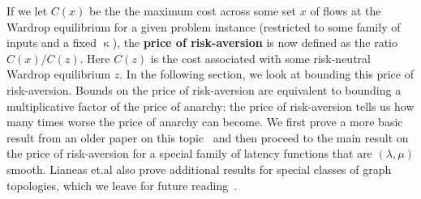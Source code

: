 If we let $C(x)$ be the the maximum cost across some set $x$ of flows at the Wardrop equilibrium for a given problem instance 
(restricted to some family of inputs and a fixed $\upkappa$), the {\textbf{price of risk-aversion}} is now defined as the
ratio $C(x)/C(z)$. Here $C(z)$ is the cost associated with some risk-neutral Wardrop equilibrium $z$. 
In the following section, we look at bounding this price of risk-aversion. 
Bounds on the price of risk-aversion are equivalent to bounding 
a multiplicative factor of the price of anarchy: the price of risk-aversion tells us how many times worse 
the price of anarchy can become.
We first prove a 
more basic result from an older paper on this topic~\cite{risk-averse-background} and then proceed to the main result on the price
of risk-aversion for 
a special family of latency functions that are $(\lambda, \mu)$ smooth. Lianeas et.al also prove additional results for special classes
of graph topologies, which we leave for future reading~\cite{risk-averse}.




